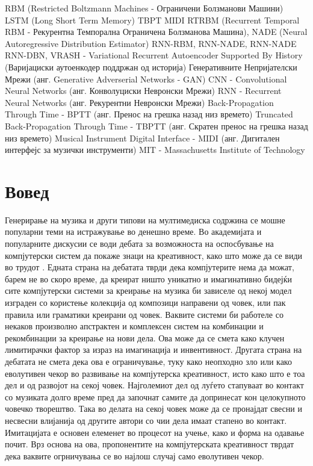 RBM (Restricted Boltzmann Machines - Ограничени Болзманови Машини)
LSTM (Long Short Term Memory)
TBPT 
MIDI
RTRBM (Recurrent Temporal RBM - Рекурентна Темпорална Ограничена Болзманова Машина), 
NADE (Neural Autoregressive Distribution Estimator)
RNN-RBM, 
RNN-NADE, 
RNN-NADE
RNN-DBN,
VRASH - Variational Recurrent Autoencoder Supported By History (Варијациски аутоенкодер поддржан од историја)
Генеративните Непријателски Мрежи (анг. Generative Adverserial Networks - GAN)
CNN - Convolutional Neural Networks (анг. Конволуциски Невронски Мрежи)
RNN - Recurrent Neural Networks (анг. Рекурентни Невронски Мрежи)
Back-Propagation Through Time - BPTT (анг. Пренос на грешка назад низ времето)
Truncated Back-Propagation Through Time - TBPTT (анг. Скратен пренос на грешка назад низ времето)
Musical Instrument Digital Interface - MIDI (анг. Дигитален интерфејс за музички инструменти)
MIT - Massachusetts Institute of Technology
\chapter{Вовед}

Генерирање на музика и други типови на мултимедиска содржина се мошне популарни теми на истражување во денешно време. Во академијата и популарните дискусии се води дебата за возможноста на оспосбување на компјутерски систем да покаже знаци на креативност, како што може да се види во трудот \cite{Ghedini2015}. Едната страна на дебатата тврди дека компјутерите нема да можат, барем не во скоро време, да креират ништо уникатно и имагинативно бидејќи сите компјутерски системи за креирање на музика би зависеле од некој модел изграден со користење колекција од композици направени од човек, или пак правила или граматики креирани од човек. Ваквите системи би работеле со некаков произволно апстрактен и комплексен систем на комбинации и рекомбинации за креирање на нови дела. Ова може да се смета како клучен лимитирачки фактор за израз на имагинација и инвентивност. Другата страна на дебатата не смета дека ова е ограничување, туку како неопходно зло или како еволутивен чекор во развивање на компјутерска креативност, исто како што е тоа дел и од развојот на секој човек. Најголемиот дел од луѓето стапуваат во контакт со музиката долго време пред да започнат самите да допринесат кон целокупното човечко творештво. Така во делата на секој човек може да се пронајдат свесни и несвесни влијанија од другите автори со чии дела имаат стапено во контакт. Имитацијата е основен елеменет во процесот на учење, како и форма на одавање почит. Врз основа на ова, пропонентите на компјутерската креативност тврдат дека ваквите огрничувања се во најлош случај само еволутивен чекор.


